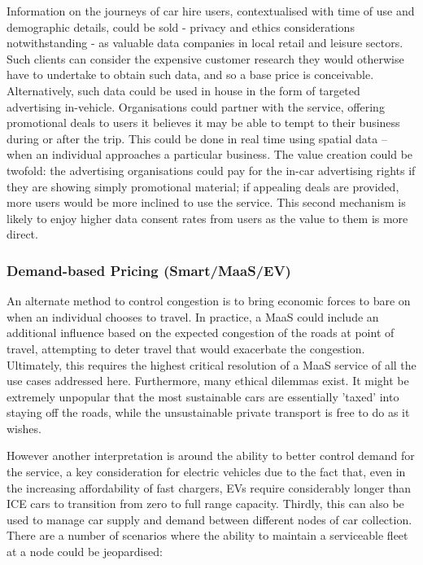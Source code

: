 \documentclass[journal]{IEEEtran}
\begin{document}
Information on the journeys of car hire users, contextualised with
time of use and demographic details, could be sold - privacy and ethics considerations notwithstanding - as valuable data
companies in local retail and leisure sectors. Such clients can
consider the expensive customer research they would otherwise have to
undertake to obtain such data, and so a base price is conceivable.
Alternatively, such data could be used in house in the form of
targeted advertising in-vehicle. Organisations could partner with the
service, offering promotional deals to users it believes it may be
able to tempt to their business during or after the trip. This could
be done in real time using spatial data – when an individual
approaches a particular business. The value creation could be twofold:
the advertising organisations could pay for the in-car advertising
rights if they are showing simply promotional material; if appealing
deals are provided, more users would be more inclined to use the
service. This second mechanism is likely to enjoy higher data consent
rates from users as the value to them is more direct.


\subsubsection{Demand-based Pricing (Smart/MaaS/EV)}

An alternate method to control congestion is to bring economic forces
to bare on when an individual chooses to travel. In practice, a MaaS
could include an additional influence based on the expected congestion
of the roads at point of travel, attempting to deter travel that would
exacerbate the congestion. Ultimately, this requires the highest
critical resolution of a MaaS service of all the use cases addressed
here. Furthermore, many ethical dilemmas exist. It might be extremely
unpopular that the most sustainable cars are essentially 'taxed' into
staying off the roads, while the unsustainable private transport is
free to do as it wishes.

However another interpretation is around the ability to better control
demand for the service, a key consideration for electric vehicles due
to the fact that, even in the increasing affordability of fast
chargers, EVs require considerably longer than ICE cars to transition
from zero to full range capacity. Thirdly, this can also be used to
manage car supply and demand between different nodes of car
collection. There are a number of scenarios where the ability to
maintain a serviceable fleet at a node could be jeopardised:
\end{document}
